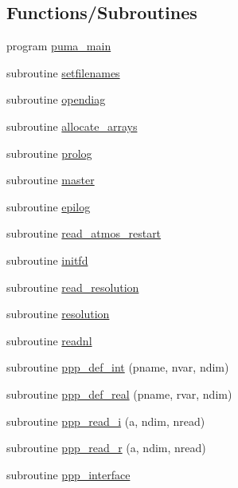 \subsection*{\-Functions/\-Subroutines}
\begin{DoxyCompactItemize}
\item 
program \hyperlink{puma_8f90_ab9b07e4288c177e089731e7560c18ac1}{puma\-\_\-main}
\item 
subroutine \hyperlink{puma_8f90_a37eac16619683a2be841fc68b9281299}{setfilenames}
\item 
subroutine \hyperlink{puma_8f90_ab7757291a70ca39d0c7a7e8db515c058}{opendiag}
\item 
subroutine \hyperlink{puma_8f90_a486bae2289e6e28e652b41555030d3e6}{allocate\-\_\-arrays}
\item 
subroutine \hyperlink{puma_8f90_afde378004f20ed8741a7e9bcd82cbfe4}{prolog}
\item 
subroutine \hyperlink{puma_8f90_af02944c9cc5103c31e4ed9b779e7cc79}{master}
\item 
subroutine \hyperlink{puma_8f90_a35d7c22447dc50ab86832b4615994d32}{epilog}
\item 
subroutine \hyperlink{puma_8f90_aa07fedd638dbdd8e1799b83d34eb35e3}{read\-\_\-atmos\-\_\-restart}
\item 
subroutine \hyperlink{puma_8f90_a51f5938296dd343ce807dbb6d1a16e49}{initfd}
\item 
subroutine \hyperlink{puma_8f90_a811c67568d6f12806d6b6f86813d2bc4}{read\-\_\-resolution}
\item 
subroutine \hyperlink{puma_8f90_a0952e51b37b6196b4f5d85a5cb93c75b}{resolution}
\item 
subroutine \hyperlink{puma_8f90_a8a75958ca9ba25aeec49db140b483871}{readnl}
\item 
subroutine \hyperlink{puma_8f90_ad3f0e22c057591beabda5d99c3f40c4c}{ppp\-\_\-def\-\_\-int} (pname, nvar, ndim)
\item 
subroutine \hyperlink{puma_8f90_a3e4cf6a68be16437f50762bf77e52370}{ppp\-\_\-def\-\_\-real} (pname, rvar, ndim)
\item 
subroutine \hyperlink{puma_8f90_a4c83f2cca37be70c03946309fc4e2a52}{ppp\-\_\-read\-\_\-i} (a, ndim, nread)
\item 
subroutine \hyperlink{puma_8f90_a1e7bdf5ee1faa40d34b6cc93ebc3acc3}{ppp\-\_\-read\-\_\-r} (a, ndim, nread)
\item 
subroutine \hyperlink{puma_8f90_a859f80933ca252bcc87f27d3996fea05}{ppp\-\_\-interface}
\item 

\end{DoxyCompactItemize}
